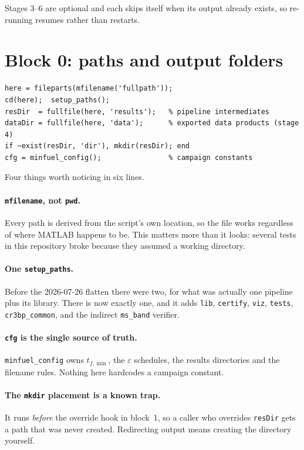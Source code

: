 \documentclass[11pt]{article}
\newcommand{\file}[1]{\texttt{#1}}
\begin{document}
Stages 3--6 are optional and each skips itself when its output already exists,
so re-running resumes rather than restarts.

\section{Block 0: paths and output folders}

\begin{lstlisting}
here = fileparts(mfilename('fullpath'));
cd(here);  setup_paths();
resDir  = fullfile(here, 'results');   % pipeline intermediates
dataDir = fullfile(here, 'data');      % exported data products (stage 4)
if ~exist(resDir, 'dir'), mkdir(resDir); end
cfg = minfuel_config();                % campaign constants
\end{lstlisting}

Four things worth noticing in six lines.

\paragraph{\file{mfilename}, not \file{pwd}.} Every path is derived from the
script's own location, so the file works regardless of where MATLAB happens to
be. This matters more than it looks: several tests in this repository broke
because they assumed a working directory.

\paragraph{One \file{setup\_paths}.} Before the 2026-07-26 flatten there were
two, for what was actually one pipeline plus its library. There is now exactly
one, and it adds \file{lib}, \file{certify}, \file{viz}, \file{tests},
\file{cr3bp\_common}, and the indirect \file{ms\_band} verifier.

\paragraph{\file{cfg} is the single source of truth.} \file{minfuel\_config}
owns $t_{f,\min}$, the $\varepsilon$ schedules, the results directories and the
filename rules. Nothing here hardcodes a campaign constant.

\paragraph{The \file{mkdir} placement is a known trap.} It runs \emph{before}
the override hook in block~1, so a caller who overrides \texttt{resDir} gets a
path that was never created. Redirecting output means creating the directory
yourself.
\end{document}
